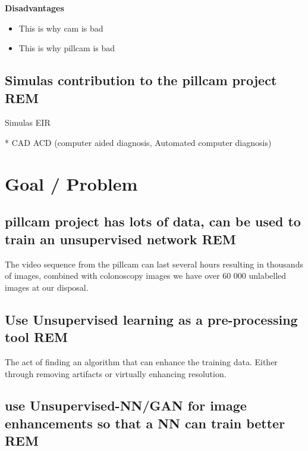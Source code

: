 	\vspace{5px}
	\textbf{Disadvantages}
	  \begin{itemize}
	    \item This is why cam is bad %
	    \item This is why pillcam is bad %
	  \end{itemize}
 
	
	
    \vspace{10px}

  \subsection{Simulas contribution to the pillcam project REM}
    Simulas EIR
		

		
    * CAD ACD (computer aided diagnosis, Automated computer diagnosis)

    \vspace{10px}
	
\section{Goal / Problem}
  \subsection{pillcam project has lots of data, can be used to train an unsupervised network REM}
    The video sequence from the pillcam can last several hours resulting in thousands of images, combined with colonoscopy images
    we have over 60 000 unlabelled images at our disposal. 
    
  \subsection{Use Unsupervised learning as a pre-processing tool REM}
    The act of finding an algorithm that can enhance the training data. 
    Either through removing artifacts or virtually enhancing resolution.
    
  \subsection{use Unsupervised-NN/GAN for image enhancements so that a NN can train better REM}
    
